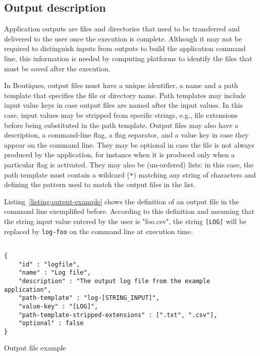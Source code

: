 \documentclass{article}
\newcommand{\boutiques}{Boutiques\xspace}
\begin{document}
\subsection{Output description}

Application outputs are files and directories that need to be
transferred and delivered to the user once the execution is
complete. Although it may not be required to distinguish inputs from
outputs to build the application command line, this information is
needed by computing platforms to identify the files that must be saved
after the execution.

In \boutiques, output files must have a unique identifier, a name and
a path template that specifies the file or directory name. Path
templates may include input value keys in case output files are named
after the input values. In this case, input values may be stripped
from specific strings, e.g., file extensions before being substituted
in the path template. Output files may also have a description, a
command-line flag, a flag separator, and a value key in case they
appear on the command line. They may be optional in case the file is
not always produced by the application, for instance when it is
produced only when a particular flag is activated. They may also be
(un-ordered) lists: in this case, the path template must contain a
wildcard (\texttt{*}) matching any string of characters and defining
the pattern used to match the output files in the list.

Listing~\ref{listing:output-example} shows the definition of an output
file in the command line exemplified before. According to this
definition and assuming that the string input value entered by the
user is "foo.csv", the string \texttt{[LOG]} will be
replaced by \texttt{log-foo} on the command line at execution time.

\begin{listing}
\begin{verbatim}

{
    "id" : "logfile",
    "name" : "Log file",
    "description" : "The output log file from the example application",
    "path-template" : "log-[STRING_INPUT]",
    "value-key" : "[LOG]",
    "path-template-stripped-extensions" : [".txt", ".csv"],
    "optional" : false
}
\end{verbatim}
\caption{Output file example} 
\label{listing:output-example}
\end{listing}
\end{document}
